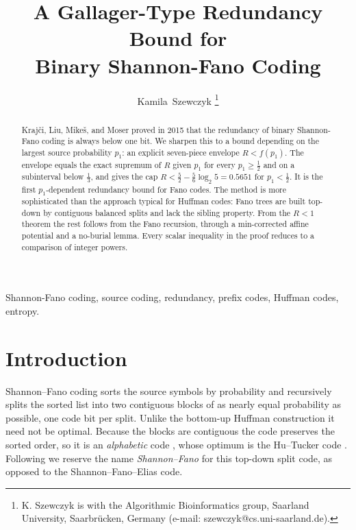 \documentclass[journal]{IEEEtran}
\title{A Gallager-Type Redundancy Bound for\\ Binary Shannon-Fano Coding}
\author{Kamila~Szewczyk%
\thanks{K. Szewczyk is with the Algorithmic Bioinformatics group,
Saarland University, Saarbr\"ucken, Germany
(e-mail: szewczyk@cs.uni-saarland.de).}}
\theoremstyle{definition}
\begin{document}
\maketitle

\begin{abstract}
Kraj\v{c}i, Liu, Mike\v{s}, and Moser proved in 2015 that the redundancy of
binary Shannon-Fano coding is always below one bit. We sharpen this to a bound
depending on the largest source probability $p_1$: an explicit seven-piece
envelope $R<f(p_1)$. The envelope equals the exact supremum of $R$ given $p_1$
for every $p_1\ge\tfrac12$ and on a subinterval below $\tfrac13$, and gives the
cap $R<\tfrac52-\tfrac56\log_2 5=0.5651$ for $p_1<\tfrac12$. It is the first
$p_1$-dependent redundancy bound for Fano codes. The method is more sophisticated
than the approach typical for Huffman codes:
Fano trees are built top-down by contiguous balanced splits and lack the
sibling property. From the $R<1$ theorem the rest follows from the Fano
recursion, through a min-corrected affine potential and a no-burial lemma. Every
scalar inequality in the proof reduces to a comparison of integer powers.
\end{abstract}

\begin{IEEEkeywords}
Shannon-Fano coding, source coding, redundancy, prefix codes, Huffman codes,
entropy.
\end{IEEEkeywords}

\IEEEpeerreviewmaketitle

\section{Introduction}\label{sec:intro}

 Shannon--Fano coding \cite{Shannon48,Fano49} sorts the
source symbols by probability and recursively splits the sorted list into two
contiguous blocks of as nearly equal probability as possible, one code bit per
split. Unlike the bottom-up Huffman construction \cite{Huffman52} it need not be
optimal. Because the blocks are contiguous the code preserves the sorted order,
so it is an \emph{alphabetic} code \cite{GilbertMoore59}, whose optimum is the
Hu--Tucker code \cite{HuTucker71}. Following \cite{CoverThomas06} we reserve the
name \emph{Shannon--Fano} for this top-down split code, as opposed to the
Shannon--Fano--Elias code.
\end{document}
